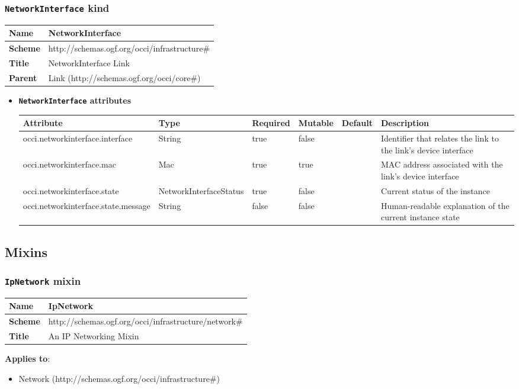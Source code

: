 \subsubsection{\texttt{NetworkInterface} kind}
\begin{center}
\begin{tabular}{|l|l|}
  \hline
  \textbf{Name} & NetworkInterface \\
  \hline  
  \textbf{Scheme} & http://schemas.ogf.org/occi/infrastructure\# \\
  \hline
  \textbf{Title} & NetworkInterface Link \\
  \hline
  \textbf{Parent} & Link (http://schemas.ogf.org/occi/core\#) \\
  \hline
\end{tabular}
\end{center}
\begin{itemize}
\item \textbf{\texttt{NetworkInterface} attributes}

\begin{tabularx}{\textwidth}{|l|l|p{1.4cm}|p{1.3cm}|l|X|}
  \hline
  \textbf{Attribute} & \textbf{Type} & \textbf{Required} & \textbf{Mutable} & \textbf{Default} & \textbf{Description} \\
  \hline  
  occi.networkinterface.interface & String & true & false &  & Identifier that relates the link to the link's device interface \\
  \hline
  occi.networkinterface.mac & Mac & true & true &  & MAC address associated with the link's device interface \\
  \hline
  occi.networkinterface.state & NetworkInterfaceStatus & true & false &  & Current status of the instance \\
  \hline
  occi.networkinterface.state.message & String & false & false &  & Human-readable explanation of the current instance state \\
  \hline
\end{tabularx}
\end{itemize}


\subsection{Mixins}
\subsubsection{\texttt{IpNetwork} mixin}
\begin{center}
\begin{tabular}{|l|l|}
  \hline
  \textbf{Name} & IpNetwork \\
  \hline  
  \textbf{Scheme} & http://schemas.ogf.org/occi/infrastructure/network\# \\
  \hline
  \textbf{Title} & An IP Networking Mixin \\
  \hline
\end{tabular}
\end{center}
\textbf{Applies to}:
\begin{itemize}
	\item Network (http://schemas.ogf.org/occi/infrastructure\#)
\end{itemize}

